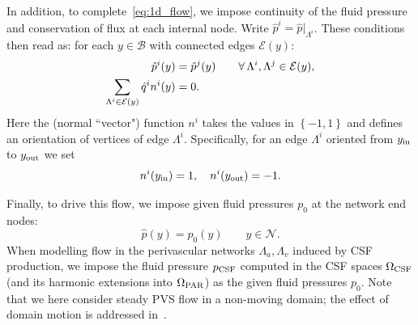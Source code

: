 \documentclass[fleqn,10pt]{wlscirep}
\begin{document}
In addition, to complete~\eqref{eq:1d_flow}, we impose continuity of
the fluid pressure and conservation of flux at each internal node. Write
$\hat{p}^i = \hat{p}|_{\Lambda^i}$. These conditions then read as: for
each $y \in \mathcal{B}$ with connected edges $\mathcal{E}(y)$:
\begin{subequations}
\begin{align}
  \hat{p}^i(y) &= \hat{p}^j(y) \qquad \forall \, \Lambda^i, \Lambda^j \in \mathcal{E}(y), \\
  \sum_{\Lambda^i \in \mathcal{E}(y)} \hat{q}^i n^i(y) &= 0  .
\end{align}
\label{eq:1d_flow:bifurcations}
\end{subequations}
Here the (normal ``vector") function $n^i$ takes the values in $\left\{-1, 1\right\}$ and 
defines an orientation of vertices of edge $\Lambda^i$. Specifically, for an edge $\Lambda^i$ oriented from $y_{\rm in}$ to $y_{\rm out}$ we set 
\begin{equation}
  n^i(y_{\rm in}) = 1,\quad
  n^i(y_{\rm{out}}) = -1. %
\label{eq:def:sign}
\end{equation}

Finally, to drive this flow, we impose given fluid pressures $p_0$ at the
network end nodes:
\begin{equation}
  \hat{p}(y) = p_0(y) \qquad y \in \mathcal{N} .
  \label{eq:1d_flow:bcs}
\end{equation}
When modelling flow in the perivascular networks
$\Lambda_a, \Lambda_v$ induced by CSF production, we impose the fluid
pressure $p_{\rm CSF}$ computed in the CSF spaces $\Omega_{\rm CSF}$
(and its harmonic extensions into $\Omega_{\rm PAR}$) as the given
fluid pressures $p_0$. Note that we here consider steady PVS flow in a
non-moving domain; the effect of domain motion is addressed
in~.
\end{document}
